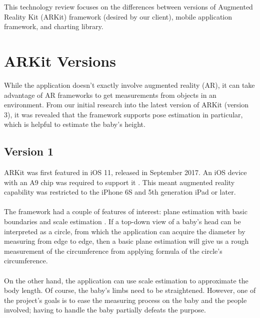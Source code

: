 \documentclass[onecolumn, draftclsnofoot,10pt, compsoc]{IEEEtran}
\begin{document}
\noindent This technology review focuses on the differences between versions of Augmented Reality Kit (ARKit) framework (desired by our client), mobile application framework, and charting library.


\section{ARKit Versions}
While the application doesn't exactly involve augmented reality (AR), it can take advantage of AR frameworks to get measurements from objects in an environment.
From our initial research into the latest version of ARKit (version 3), it was revealed that the framework supports pose estimation in particular, which is helpful to estimate the baby's height.

\subsection{Version 1}
ARKit was first featured in iOS 11, released in September 2017. An iOS device with an A9 chip was required to support it \cite{ARKit_A9_processor}.
This meant augmented reality capability was restricted to the iPhone 6S and 5th generation iPad or later.
\\\\
The framework had a couple of features of interest: plane estimation with basic boundaries and scale estimation \cite{ARKit1_features}.
If a top-down view of a baby's head can be interpreted as a circle, from which the application can acquire the diameter by measuring from edge to edge, then a basic plane estimation will give us a rough measurement of the circumference from applying formula of the circle's circumference.
\\\\
On the other hand, the application can use scale estimation to approximate the body length. Of course, the baby's limbs need to be straightened. However, one of the project's goals is to ease the measuring process on the baby and the people involved; having to handle the baby partially defeats the purpose.
\end{document}
